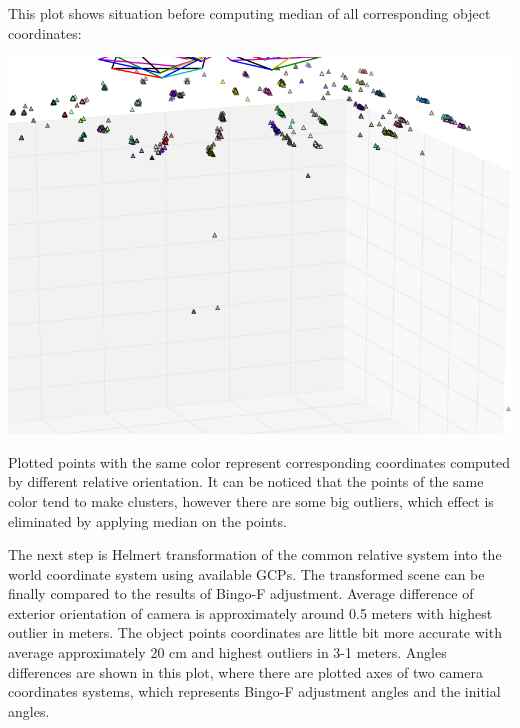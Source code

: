 \documentclass[a4paper,12pt]{article}
\begin{document}

This plot shows situation before computing median of all corresponding object coordinates:

\includegraphics[scale=0.45]{figures/before_median.png}

Plotted points with the same color represent corresponding coordinates computed by different relative orientation. It can be noticed that 
the points of the same color tend to make clusters, however there are some big outliers, which effect is eliminated by applying
median on the points.

The next step is Helmert transformation of the common relative system into the world coordinate system using available GCPs.
The transformed scene can be finally compared to the results of Bingo-F adjustment.
Average difference of exterior orientation 
of camera is approximately around 0.5 meters with highest outlier in meters. The object points coordinates 
are little bit more accurate with average approximately 20 cm and highest outliers in 3-1 meters. 
Angles differences are shown in this plot, where there are plotted axes of two camera coordinates systems, which represents 
Bingo-F adjustment angles and the  initial angles. 

\end{document}
